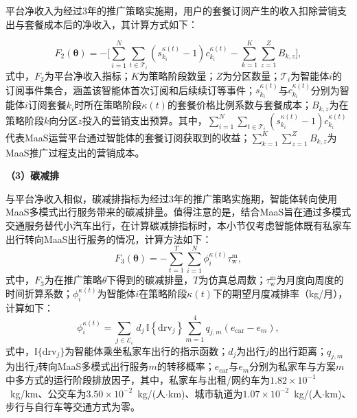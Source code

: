 平台净收入为经过3年的推广策略实施期，用户的套餐订阅产生的收入扣除营销支出与套餐成本后的净收入，其计算方式如下：

\begin{equation}
F_{2}(\bm{\theta}) = -\Bigg[\sum_{i=1}^{N}\sum_{t\in\mathcal{T}_{i}}\left(s_{k_{i}}^{\kappa(t)}-1\right)c_{k_{i}}^{\kappa(t)}
-\sum_{k=1}^{K}\sum_{z=1}^{Z}B_{k,z}\Bigg],
\label{eq.opt.objrevenue}
\end{equation}
式中，$F_{2}$为平台净收入指标；$K$为策略阶段数量；$Z$为分区数量；$\mathcal{T}_{i}$为智能体$i$的订阅事件集合，涵盖该智能体首次订阅和后续续订等事件；$s_{k_{i}}^{\kappa(t)}$与$c_{k_{i}}^{\kappa(t)}$分别为智能体$i$订阅套餐$k_{i}$时所在策略阶段$\kappa(t)$的套餐价格比例系数与套餐成本；$B_{k,z}$为在策略阶段$k$向分区$z$投入的营销支出预算。其中，$\sum_{i=1}^{N}\sum_{t\in\mathcal{T}_{i}}\left(s_{k_{i}}^{\kappa(t)}-1\right)c_{k_{i}}^{\kappa(t)}$代表MaaS运营平台通过智能体的套餐订阅获取到的收益；$\sum_{k=1}^{K}\sum_{z=1}^{Z}B_{k,z}$为MaaS推广过程支出的营销成本。

\textbf{（3）碳减排}

与平台净收入相似，碳减排指标为经过3年的推广策略实施期，智能体转向使用MaaS多模式出行服务带来的碳减排量。值得注意的是，结合MaaS旨在通过多模式交通服务替代小汽车出行，在计算碳减排指标时，本小节仅考虑智能体既有私家车出行转向MaaS出行服务的情况，计算方法如下：
\begin{equation}
F_{3}(\bm{\theta}) = -\sum_{t=1}^{T}\sum_{i=1}^{N}\phi_{i}^{\kappa(t)}\tau^{\mathrm{m}} _{\mathrm{w}},
\label{eq.opt.objcarbon}
\end{equation}
式中，$F_{3}$为在推广策略$\theta$下得到的碳减排量，$T$为仿真总周数；$\tau^{\mathrm{m}} _{\mathrm{w}}$为月度向周度的时间折算系数；$\phi_{i}^{\kappa(t)}$为智能体$i$在策略阶段$\kappa(t)$下的期望月度减排率（kg/月），计算如下：
\begin{equation}
\phi_{i}^{\kappa(t)} = \sum_{j\in\mathcal{E}_{i}}\,d_{j}\,\mathbb{I}\left\{\mathrm{drv}_{j}\right\}\sum_{m=1}^{4}q_{j,m}\left(e_{\mathrm{car}}-e_{m}\right),
\label{eq.opt.shiftrate}
\end{equation}
式中，$\mathbb{I}\{\mathrm{drv}_{j}\}$为智能体乘坐私家车出行的指示函数；$d_{j}$为出行$j$的出行距离；$q_{j,m}$为出行$j$转向MaaS多模式出行服务$m$的转移概率；$e_{\mathrm{car}}$与$e_{m}$分别为私家车与方案$m$中多方式的运行阶段排放因子，其中，私家车与出租/网约车为$1.82\times10^{-1}$~kg/km\cite{zhangLifeCycleEmissions2023}、公交车为$3.50\times10^{-2}$~kg/(人$\cdot$km)\cite{zhangxiuyuan2014StatisticalEstimation}、城市轨道为$1.07\times10^{-2}$~kg/(人$\cdot$km)\cite{zhangxiuyuan2014StatisticalEstimation}、步行与自行车等交通方式为零。

